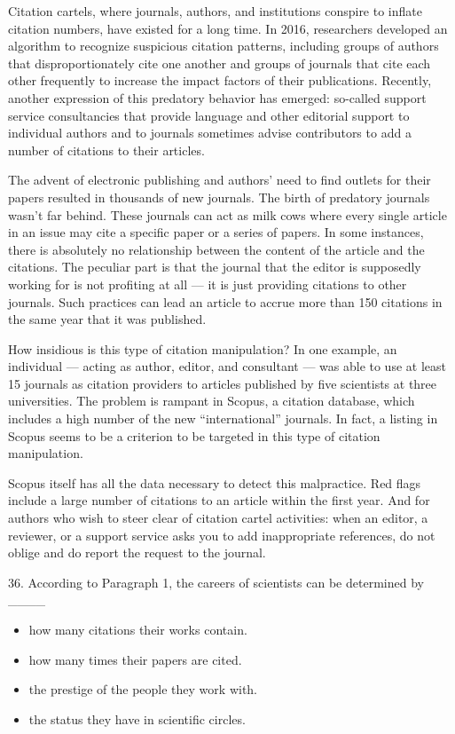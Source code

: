 \documentclass[UTF8,11pt]{ctexart}
\begin{document}
Citation cartels, where journals, authors, and institutions conspire to inflate citation numbers, have existed for a long time. In 2016, researchers developed an algorithm to recognize suspicious citation patterns, including groups of authors that disproportionately cite one another and groups of journals that cite each other frequently to increase the impact factors of their publications. Recently, another expression of this predatory behavior has emerged: so-called support service consultancies that provide language and other editorial support to individual authors and to journals sometimes advise contributors to add a number of citations to their articles.


The advent of electronic publishing and authors’ need to find outlets for their papers resulted in thousands of new journals. The birth of predatory journals wasn’t far behind. These journals can act as milk cows where every single article in an issue may cite a specific paper or a series of papers. In some instances, there is absolutely no relationship between the content of the article and the citations. The peculiar part is that the journal that the editor is supposedly working for is not profiting at all — it is just providing citations to other journals. Such practices can lead an article to accrue more than 150 citations in the same year that it was published.


How insidious is this type of citation manipulation? In one example, an individual — acting as author, editor, and consultant — was able to use at least 15 journals as citation providers to articles published by five scientists at three universities. The problem is rampant in Scopus, a citation database, which includes a high number of the new “international” journals. In fact, a listing in Scopus seems to be a criterion to be targeted in this type of citation manipulation.


Scopus itself has all the data necessary to detect this malpractice. Red flags include a large number of citations to an article within the first year. And for authors who wish to steer clear of citation cartel activities: when an editor, a reviewer, or a support service asks you to add inappropriate references, do not oblige and do report the request to the journal.


36. According to Paragraph 1, the careers of scientists can be determined by \_\_\_\_


\begin{itemize}[leftmargin=2em,itemsep=.2em,topsep=.4em]\item[A.] how many citations their works contain.
\item[B.] how many times their papers are cited.
\item[C.] the prestige of the people they work with.
\item[D.] the status they have in scientific circles.
\end{itemize}
\end{document}
